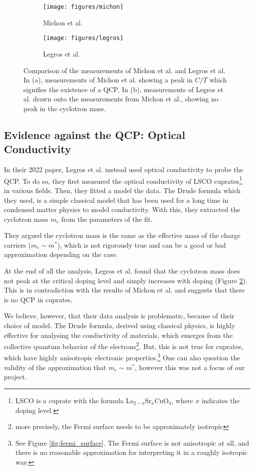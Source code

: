 \begin{figure}
    \centering
    \begin{subfigure}{0.48\textwidth}
        \centering
        \texttt{[image: figures/michon]}
        \caption{Michon et al.\cite{michon2019}}
        \label{fig:michon}
    \end{subfigure}\hfill
    \begin{subfigure}{0.48\textwidth}
        \centering
        \texttt{[image: figures/legros]}
        \caption{Legros et al.\cite{legros2022}}
        \label{fig:legros}
    \end{subfigure}
    \caption{Comparison of the measurements of Michon et al.\cite{michon2019} and Legros et al.\cite{legros2022} In (a), measurements
    of Michon et al. showing a peak in $C/T$ which signifies the existence of a QCP. In (b),
    measurements of Legros et al. drawn onto the measurements from Michon et al.,
    showing no peak in the cyclotron mass.}
    \label{fig:comparison}
\end{figure}

\subsection{Evidence against the QCP: Optical Conductivity}
In their 2022 paper, Legros et al.\cite{legros2022} instead used optical conductivity to
probe the QCP. To do so, they first measured the optical conductivity of LSCO cuprates\footnote{
LSCO is a cuprate with the formula La$_{2-x}$Sr$_x$CuO$_4$, where $x$ indicates the doping level.} in various fields. 
Then, they fitted a model the data. 
The Drude formula which they used, is a simple classical model that has been used for a long time in condensed matter physics to model conductivity. 
With this, they extracted the cyclotron mass $m_c$ from the parameters of the fit.

They argued the cyclotron mass is the same as the effective mass of the charge carriers
($m_c \sim m^*$), which is not rigorously true and can be a good or bad approximation depending on the case.

At the end of all the analysis, Legros et al.\cite{legros2022} found that the cyclotron mass does not peak
at the critical doping level and simply increases with doping (Figure \ref{fig:legros}). This is in contradiction with the
results of Michon et al. and suggests that there is no QCP in cuprates.

We believe, however, that their data analysis is problematic, because of their choice of model. 
The Drude formula, derived using classical physics, is highly effective for
analysing the conductivity of materials, which emerges from the collective quantum behavior of the
electrons\footnote{more precisely, the Fermi surface needs to be approximately isotropic}. 
But, this is not true for cuprates, 
which have highly anisotropic electronic properties.\footnote{See Figure
\ref{fig:fermi_surface}. The Fermi surface is not anisotropic at all, and there is no reasonable
approximation for interpreting it in a roughly isotropic way.} 
One can also question the validity of the approximation that $m_c \sim m^*$, 
however this was not a focus of our project.
